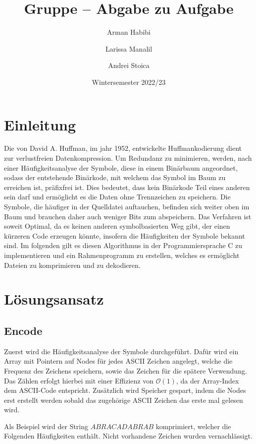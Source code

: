 \documentclass[course=erap]{aspdoc}
\author{Arman Habibi \and Larissa Manalil \and Andrei Stoica}
\date{Wintersemester 2022/23} %
\title{Gruppe \theGroup{} -- Abgabe zu Aufgabe \theNumber}
\begin{document}
\maketitle

\section{Einleitung}

Die von David A. Huffman, im jahr 1952, entwickelte Huffmankodierung dient zur verlustfreien Datenkompression.
Um Redundanz zu minimieren, werden, nach einer Häufigkeitsanalyse der Symbole, diese in einem Binärbaum angeordnet, sodass der entstehende Binärkode, mit welchem das Symbol im Baum zu erreichen ist, präfixfrei ist.
Dies bedeutet, dass kein Binärkode Teil eines anderen sein darf und ermöglicht es die Daten ohne Trennzeichen zu speichern. Die Symbole, die häufiger in der Quelldatei auftauchen, befinden sich weiter oben im Baum und brauchen daher auch weniger Bits zum abspeichern. 
Das Verfahren ist soweit Optimal, da es keinen anderen symbolbasierten Weg gibt, der einen kürzeren Code erzeugen könnte, insofern die Häufigkeiten der Symbole bekannt sind. \cite{4051119}
Im folgenden gilt es diesen Algorithmus in der Programmiersprache C zu implementieren und ein Rahmenprogramm zu erstellen, welches es ermöglicht Dateien zu komprimieren und zu dekodieren.

\section{Lösungsansatz}

\subsection{Encode}

Zuerst wird die Häufigkeitsanalyse der Symbole durchgeführt. Dafür wird ein Array mit Pointern auf Nodes für jedes ASCII Zeichen angelegt, welche die Frequenz des Zeichens speichern, sowie das Zeichen für die spätere Verwendung. Das Zählen erfolgt hierbei mit einer Effizienz von $\mathcal{O}(1)$, da der Array-Index dem ASCII-Code entspricht.
Zusätzlich wird Speicher gespart, indem die Nodes erst erstellt werden sobald das zugehörige ASCII Zeichen das erste mal gelesen wird.

Als Beispiel wird der String $ABRACADABRAB$ komprimiert, welcher die Folgenden Häufigkeiten enthält. Nicht vorhandene Zeichen wurden vernachlässigt.
\end{document}

